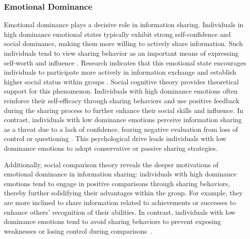 \subsubsection{Emotional Dominance}

Emotional dominance plays a decisive role in information sharing. Individuals in high dominance emotional states typically exhibit strong self-confidence and social dominance, making them more willing to actively share information. Such individuals tend to view sharing behavior as an important means of expressing self-worth and influence \cite{mehrabian1996pleasure}. Research indicates that this emotional state encourages individuals to participate more actively in information exchange and establish higher social status within groups \cite{fredrickson2001role}. Social cognitive theory \cite{bandura1989human} provides theoretical support for this phenomenon. Individuals with high dominance emotions often reinforce their self-efficacy through sharing behaviors and use positive feedback during the sharing process to further enhance their social skills and influence. In contrast, individuals with low dominance emotions perceive information sharing as a threat due to a lack of confidence, fearing negative evaluation from loss of control or questioning \cite{lebel2017moving}. This psychological drive leads individuals with low dominance emotions to adopt conservative or passive sharing strategies.

Additionally, social comparison theory \cite{festinger1954theory} reveals the deeper motivations of emotional dominance in information sharing: individuals with high dominance emotions tend to engage in positive comparisons through sharing behaviors, thereby further solidifying their advantages within the group. For example, they are more inclined to share information related to achievements or successes to enhance others’ recognition of their abilities. In contrast, individuals with low dominance emotions tend to avoid sharing behaviors to prevent exposing weaknesses or losing control during comparisons~\cite{morrison2000organizational}.

